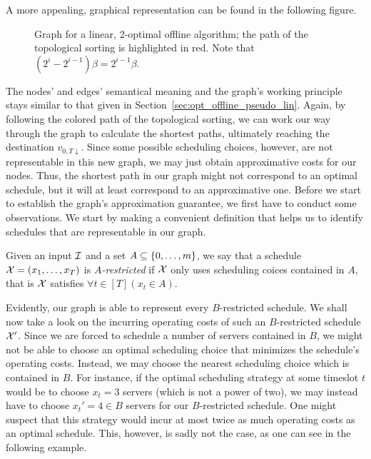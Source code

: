 A more appealing, graphical representation can be found in the following figure.
\begin{figure}[H]

\caption{Graph for a linear, 2-optimal offline algorithm; the path of the topological sorting is highlighted in red. Note that $(2^i-2^{i-1})\beta =2^{i-1}\beta$.}
\label{fig:graph_lin_approx_2}
\end{figure}
The nodes' and edges' semantical meaning and the graph's working principle stays similar to that given in Section~\ref{sec:opt_offline_pseudo_lin}. Again, by following the colored path of the topological sorting, we can work our way through the graph to calculate the shortest paths, ultimately reaching the destination $v_{0,T\downarrow}$. Since some possible scheduling choices, however, are not representable in this new graph, we may just obtain approximative costs for our nodes. Thus, the shortest path in our graph might not correspond to an optimal schedule, but it will at least correspond to an approximative one. Before we start to establish the graph's approximation guarantee, we first have to conduct some observations. We start by making a convenient definition that helps us to identify schedules that are representable in our graph.
\begin{defn}
Given an input $\mathcal{I}$ and a set $A\subseteq\{0,\dotsc,m\}$, we say that a schedule $\mathcal{X}=(x_1,\dotsc,x_T)$ is \emph{$A$-restricted} if $\mathcal{X}$ only uses scheduling coices contained in $A$, that is $\mathcal{X}$ satisfies $\forall t\in[T](x_t\in A)$.
\end{defn}
Evidently, our graph is able to represent every $B$-restricted schedule. We shall now take a look on the incurring operating costs of such an $B$-restricted schedule $\mathcal{X}'$. Since we are forced to schedule a number of servers contained in $B$, we might not be able to choose an optimal scheduling choice that minimizes the schedule's operating costs. Instead, we may choose the nearest scheduling choice which is contained in $B$. For instance, if the optimal scheduling strategy at some timeslot $t$ would be to choose $x_t=3$ servers (which is not a power of two), we may instead have to choose $x_t'=4\in B$ servers for our $B$-restricted schedule. One might suspect that this strategy would incur at most twice as much operating costs as an optimal schedule. This, however, is sadly not the case, as one can see in the following example.
